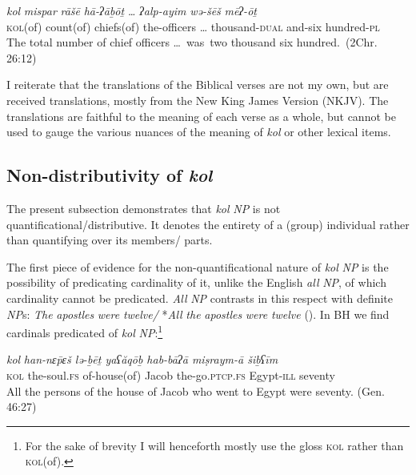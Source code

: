 \documentclass[output=paper]{langsci/langscibook}
\begin{document}
\ea%
    \label{ex:doron:13}
    \gll \textit{kol}         \textit{mispar}       \textit{rāšē}         \textit{hā-ʔāḇōṯ} \textit{…}      \textit{ʔalp-ayim}          \textit{wə-šēš}  \textit{mēʔ-ōṯ}\\
         \textsc{kol}(of) count(of)  chiefs(of) the-officers … thousand-\textsc{dual} and-six  hundred-\textsc{pl}\\
    \glt The total number of chief officers\textsuperscript{} …~was~two thousand six hundred.~(2Chr. 26:12)
    \z

I reiterate that the translations of the Biblical verses are not my own, but are received translations, mostly from the New King James Version (NKJV). The translations are faithful to the meaning of each verse as a whole, but cannot be used to gauge the various nuances of the meaning of \textit{kol} or other lexical items.

\subsection{Non-distributivity of \textit{kol}}\label{sec:doron:3.1}%

The present subsection demonstrates that \textit{kol} \textit{NP} is not quantificational/distributive. It denotes the entirety of a (group) individual rather than quantifying over its members/ parts.

The first piece of evidence for the non-quantificational nature of \textit{kol} \textit{NP} is the possibility of predicating cardinality of it, unlike the English \textit{all} \textit{NP}, of which cardinality cannot be predicated. \textit{All} \textit{NP} contrasts in this respect with definite \textit{NP}s: \textit{The} \textit{apostles} \textit{were} \textit{twelve/} *\textit{All} \textit{the} \textit{apostles} \textit{were} \textit{twelve} (\citealt{Dowty1987,Winter2002}). In BH we find cardinals predicated of \textit{kol} \textit{NP}:\footnote{For the sake of brevity I will henceforth mostly use the gloss \textsc{kol} rather than \textsc{kol}(of).}

\ea%
    \label{ex:doron:14}
    \gll \textit{kol}   \textit{han-nɛ\={p}ɛš   lə-ḇēṯ            yaʕăqōḇ  hab-bāʔā            miṣraym-ā    šiḇʕīm}\\
         \textsc{kol} the-soul.\textsc{fs} of-house(of) Jacob       the-go.\textsc{ptcp.fs}   Egypt-\textsc{ill}      seventy\\
    \glt All the persons of the house of Jacob who went to Egypt were seventy. (Gen. 46:27)
\z
\end{document}
